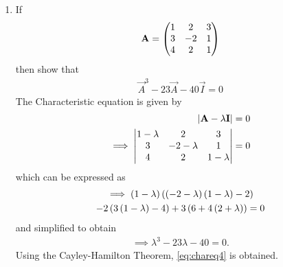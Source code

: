\documentclass[journal,12pt,twocolumn]{IEEEtran}
\renewcommand\thesection{\arabic{section}}
\begin{document}
\begin{enumerate}[label=\thesection.\arabic*.,ref=\thesection.\theenumi]
\item If 
\begin{align}
	\mathbf{A}=\begin{pmatrix} 1 &2 &3\\3 &-2 &1\\4 &2 &1\end{pmatrix}
\end{align}
then show that 
\begin{align}
	\label{eq:chareq4}
	\vec{A}^3-23\vec{A}-40\vec{I}=0
\end{align}
%  
\solution
 The Characteristic equation is given by
\begin{align}
   \left\vert\mathbf{A}-\lambda\mathbf{I}\right\vert&=0
    \\
    \implies \begin{vmatrix}1-\lambda&2&3\\3&-2-\lambda&1\\4&2&1-\lambda\end{vmatrix}&=0
    \end{align}
	which can be expressed as 
\begin{multline}
   \implies\left(1-\lambda\right)\left(\left(-2-\lambda\right)\left(1-\lambda\right)-2\right)
   \\
   -2\left(3\left(1-\lambda\right)-4\right)+3\left(6+4\left(2+\lambda\right)\right)=0
\end{multline}
and simplified to obtain 
\begin{align}
 \implies   \lambda^3-23\lambda-40=0.
\end{align}
%
Using the  Cayley-Hamilton Theorem, 	\eqref{eq:chareq4} is obtained.
%
\end{enumerate}
\end{document}
